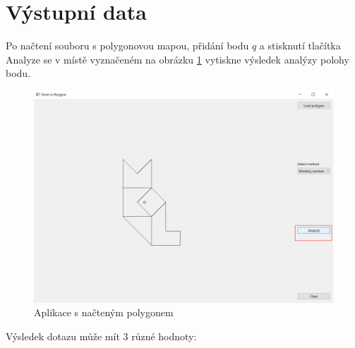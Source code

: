 \documentclass[11pt]{article}
\begin{document}

\section{Výstupní data}

Po načtení souboru s polygonovou mapou, přidání bodu $q$ a stisknutí tlačítka Analyze se v místě vyznačeném na obrázku \ref{fig:app_analyze} vytiskne výsledek analýzy polohy bodu. 

\begin{figure}[htbh]
	\centering
	\includegraphics[scale=0.4]{images/aplikace_klik_analyze.png} 
	\caption{Aplikace s načteným polygonem}
	\label{fig:app_analyze}
\end{figure} 

Výsledek dotazu může mít 3 různé hodnoty:
\end{document}
